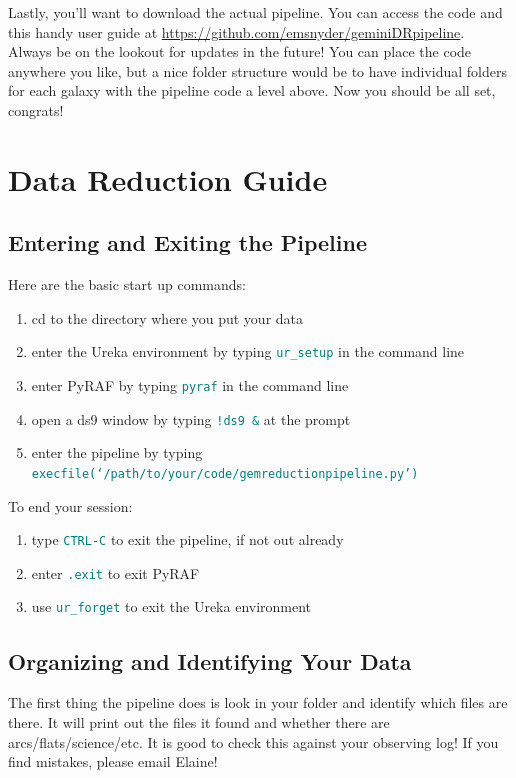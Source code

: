\documentclass[12pt]{report}
\newcommand{\ty}[1]{\textcolor{teal}{\texttt{#1}}}
\begin{document}
Lastly, you'll want to download the actual pipeline. You can access the code and this handy user guide at \url{https://github.com/emsnyder/geminiDRpipeline}. Always be on the lookout for updates in the future! You can place the code anywhere you like, but a nice folder structure would be to have individual folders for each galaxy with the pipeline code a level above. Now you should be all set, congrats!

\chapter{Data Reduction Guide}

\section{Entering and Exiting the Pipeline}
Here are the basic start up commands: 
\begin{enumerate}
\item cd to the directory where you put your data
\item enter the Ureka environment by typing \ty{ur\_setup} in the command line 
\item enter PyRAF by typing \ty{pyraf} in the command line
\item open a ds9 window by typing \ty{!ds9 \&} at the prompt
\item enter the pipeline by typing \ty{execfile(`/path/to/your/code/gemreductionpipeline.py')}
\end{enumerate}

\noindent To end your session:
\begin{enumerate}
\item type \ty{CTRL-C} to exit the pipeline, if not out already
\item enter \ty{.exit} to exit PyRAF
\item use \ty{ur\_forget} to exit the Ureka environment
\end{enumerate}

\section{Organizing and Identifying Your Data}

\noindent The first thing the pipeline does is look in your folder and identify which files are there. It will print out the files it found and whether there are arcs/flats/science/etc. It is good to check this against your observing log! If you find mistakes, please email Elaine!
\end{document}
